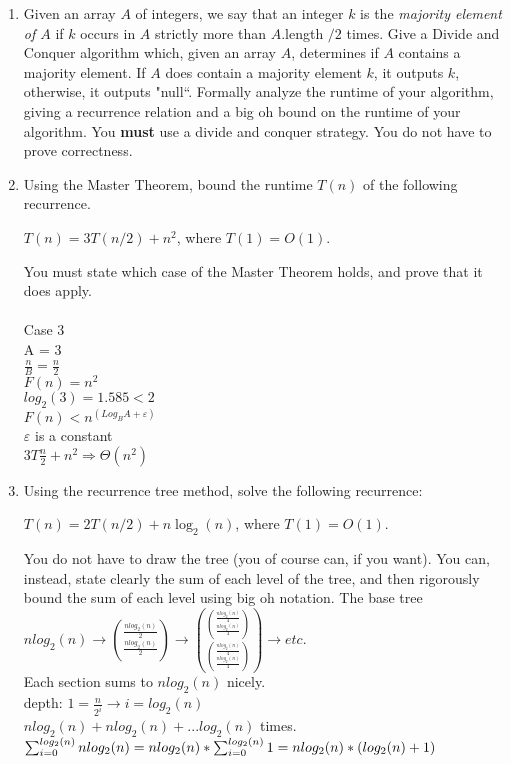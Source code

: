 \documentclass[11pt]{amsart}
\begin{document}
\begin{enumerate}
\bigskip

\item Given an array $A$ of integers, we say that an integer $k$ is the \textit{majority element of $A$} if $k$ occurs in $A$ strictly more than $A$.length $/2$ times. Give a Divide and Conquer algorithm which, given an array $A$, determines if $A$ contains a majority element. If $A$ does contain a majority element $k$, it outputs $k$, otherwise, it outputs "null``. Formally analyze the runtime of your algorithm, giving a recurrence relation and a big oh bound on the runtime of your algorithm. You \textbf{must} use a divide and conquer strategy. You do not have to prove correctness.

\bigskip

\item Using the Master Theorem, bound the runtime $T(n)$ of the following recurrence. 
\begin{center}
$T(n) = 3T(n/2) + n^2$, where $T(1) = O(1)$.
\end{center}
You must state which case of the Master Theorem holds, and prove that it does apply.
\\\\
Case 3\\
A = 3\\
$\frac{n}{B} = \frac{n}{2}$\\
$F(n) = n^2$\\
$log_2(3) = 1.585 < 2$\\
$F(n) < n^(Log_B A + \varepsilon)$\\
$\varepsilon$ is a constant\\
$3T\frac{n}{2} + n^2 \Rightarrow \Theta(n^2)$
\bigskip

\item Using the recurrence tree method, solve the following recurrence:
\begin{center}
$T(n) = 2T(n/2) + n\log_2(n)$, where $T(1) = O(1)$.
\end{center}
You do not have to draw the tree (you of course can, if you want). You can, instead, state clearly the sum of each level of the tree, and then rigorously bound the sum of each level using big oh notation.
\subitem The base tree\\$nlog_2(n)\rightarrow\binom{\frac{nlog_2(n)}{2}}{\frac{nlog_2(n)}{2}}\rightarrow\binom{\binom{\frac{nlog_2(n)}{4}}{\frac{nlog_2(n)}{4}}}{\binom{\frac{nlog_2(n)}{4}}{\frac{nlog_2(n)}{4}}}\rightarrow etc.$\\Each section sums to $nlog_2(n)$ nicely.\\depth: $1 = \frac{n}{2^i}\rightarrow i=log_2(n)$\\$nlog_2(n)+nlog_2(n)+... log_2(n)$ times.\\$\sum_{i = 0}^{log_2(n)}nlog_2(n)\\=nlog_2(n)*\sum_{i=0}^{log_2(n)}1\\=nlog_2(n)*(log_2(n)+1)$  



\end{enumerate}
\end{document}
